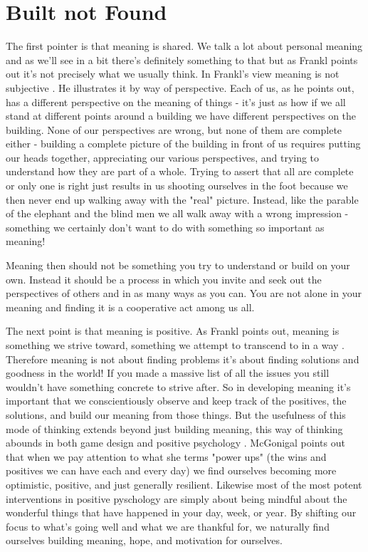 \documentclass[11pt]{book}
\begin{document}
\section{Built not Found}
The first pointer is that meaning is shared. We talk a lot about personal meaning and as we'll see in a bit there's definitely something to that but as Frankl points out it's not precisely what we usually think. In Frankl's view meaning is not subjective \cite{frankl}. He illustrates it by way of perspective. Each of us, as he points out, has a different perspective on the meaning of things - it's just as how if we all stand at different points around a building we have different perspectives on the building. None of our perspectives are wrong, but none of them are complete either - building a complete picture of the building in front of us requires putting our heads together, appreciating our various perspectives, and trying to understand how they are part of a whole. Trying to assert that all are complete or only one is right just results in us shooting ourselves in the foot because we then never end up walking away with the "real" picture. Instead, like the parable of the elephant and the blind men we all walk away with a wrong impression - something we certainly don't want to do with something so important as meaning! 
\newline

Meaning then should not be something you try to understand or build on your own. Instead it should be a process in which you invite and seek out the perspectives of others and in as many ways as you can. You are not alone in your meaning and finding it is a cooperative act among us all. 
\newline

The next point is that meaning is positive. As Frankl points out, meaning is something we strive toward, something we attempt to transcend to in a way \cite{frankl}. Therefore meaning is not about finding problems it's about finding solutions and goodness in the world! If you made a massive list of all the issues you still wouldn't have something concrete to strive after. So in developing meaning it's important that we conscientiously observe and keep track of the positives, the solutions, and build our meaning from those things. But the usefulness of this mode of thinking extends beyond just building meaning, this way of thinking abounds in both game design \cite{superbetter} and positive psychology \cite{seligman}. McGonigal points out that when we pay attention to what she terms "power ups" (the wins and positives we can have each and every day) we find ourselves becoming more optimistic, positive, and just generally resilient. Likewise most of the most potent interventions in positive pyschology are simply about being mindful about the wonderful things that have happened in your day, week, or year. By shifting our focus to what's going well and what we are thankful for, we naturally find ourselves building meaning, hope, and motivation for ourselves. 
\newline
\end{document}
